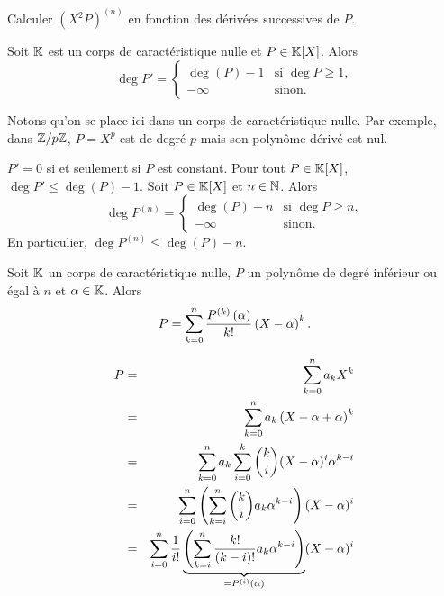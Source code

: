 \documentclass{magnolia}
\begin{document}
\begin{exoUnique}
\exo Calculer $(X^2P)^{(n)}$ en fonction des dérivées successives de $P$.
\end{exoUnique}

\begin{proposition}
Soit $\mathbb{K}$ est un corps de caractéristique nulle et $P\in\polyK$. Alors
\[\deg P'=
  \begin{cases}
  \deg(P)-1 & \text{si $\deg P\geq 1$,}\\
  -\infty & \text{sinon.}
  \end{cases}\]
\end{proposition}

\begin{preuve}
Notons qu'on se place ici dans un corps de caractéristique nulle. Par exemple, dans $\mathbb{Z}/p\mathbb{Z}$, $P=X^p$ est de degré $p$ mais son polynôme dérivé est nul.
\end{preuve}

\begin{remarques}
\remarque $P'=0$ si et seulement si $P$ est constant.
\remarque Pour tout $P\in\polyK$, $\deg P'\leq\deg(P)-1$.
\remarque Soit $P\in\polyK$ et $n\in\mathbb{N}$. Alors 
\[\deg P^{(n)}=
  \begin{cases}
  \deg(P)-n & \text{si $\deg P\geq n$,}\\
  -\infty & \text{sinon.}
  \end{cases}\]
  En particulier, $\deg P^{(n)}\leq\deg(P)-n$.
\end{remarques}

\begin{proposition}[nom={\nom{Taylor-Young}}]
Soit $\mathbb{K}$ un corps de caractéristique nulle, $P$ un polynôme de degré inférieur ou égal à $n$ et $\alpha\in\mathbb{K}$. Alors
\[P=\sum_{k=0}^n \frac{P^{(k)}\left(\alpha\right)}{k!}\left(X-\alpha\right)^k.\]  
\end{proposition}


\begin{preuve}
\begin{eqnarray*}
P&=&\sum_{k=0}^n a_kX^k\\
&=& \sum_{k=0}^n a_k\left(X-\alpha+\alpha\right)^k\\
&=&\sum_{k=0}^n a_k\sum_{i=0}^k\binom{k}{i}(X-\alpha)^i\alpha^{k-i}\\
&=&\sum_{i=0}^n\left(\sum_{k=i}^n \binom{k}{i}a_k\alpha^{k-i}\right)(X-\alpha)^i\\
&=&\sum_{i=0}^n\frac{1}{i!}\underbrace{\left(\sum_{k=i}^n \frac{k!}{(k-i)!}a_k\alpha^{k-i}\right)}_{=P^{(i)}(\alpha)}(X-\alpha)^i
\end{eqnarray*}
\end{preuve}

\end{document}
